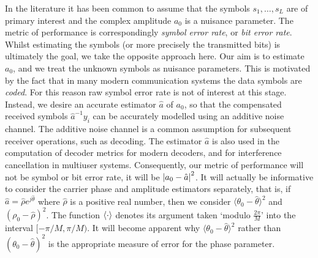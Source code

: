 \documentclass{article}
\begin{document}

In the literature it has been common to assume that the symbols $s_1, \dots, s_L$ are of primary interest and the complex amplitude $a_0$ is a nuisance parameter.  The metric of performance is correspondingly \emph{symbol error rate}, or \emph{bit error rate}.  Whilst estimating the symbols (or more precisely the transmitted bits) is ultimately the goal, we take the opposite approach here.  Our aim is to estimate $a_0$, and we treat the unknown symbols as nuisance parameters.  This is motivated by the fact that in many modern communication systems the data symbols are \emph{coded}.  For this reason raw symbol error rate is not of interest at this stage.  Instead, we desire an accurate estimator $\hat{a}$ of $a_0$, so that the compensated received symbols $\hat{a}^{-1}y_i$ can be accurately modelled using an additive noise channel.  The additive noise channel is a common assumption for subsequent receiver operations, such as decoding.  The estimator $\hat{a}$ is also used in the computation of decoder metrics for modern decoders, and for interference cancellation in multiuser systems.  Consequently, our metric of performance will not be symbol or bit error rate, it will be ${\left\vert a_0 - \hat{a} \right\vert}^2$. It will actually be informative to consider the carrier phase and amplitude estimators separately, that is, if $\hat{a} = \hat{\rho}e^{j\hat{\theta}}$ where $\hat{\rho}$ is a positive real number, then we consider $\langle\theta_0 - \hat{\theta}\rangle^2$ and $(\rho_0 - \hat{\rho})^2$.  The function $\left\langle \cdot \right\rangle$ denotes its argument taken `modulo $\tfrac{2\pi}{M}$' into the interval $[-\pi/M, \pi/M)$.  It will become apparent why $\langle\theta_0 - \hat{\theta}\rangle^2$ rather than $(\theta_0 - \hat{\theta})^2$ is the appropriate measure of error for the phase parameter.
\end{document}
